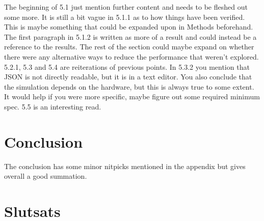 \documentclass[12pt,a4paper,twoside,openright]{report}
\begin{document}
The beginning of 5.1 just mention further content and needs to be fleshed out
some more. It is still a bit vague in 5.1.1 as to how things have been
verified. This is maybe something that could be expanded upon in Methods
beforehand. The first paragraph in 5.1.2 is written as more of a result and
could instead be a reference to the results. The rest of the section could
maybe expand on whether there were any alternative ways to reduce the
performance that weren't explored. 5.2.1, 5.3 and 5.4 are reiterations of previous
points. In 5.3.2 you mention that JSON is not directly readable, but it is in a
text editor. You also conclude that the simulation depends on the hardware, but
this is always true to some extent. It would help if you were more specific,
maybe figure out some required minimum spec. 5.5 is an interesting read.

\section*{Conclusion}

The conclusion has some minor nitpicks mentioned in the appendix but gives
overall a good summation.

\section*{Slutsats}
\end{document}
